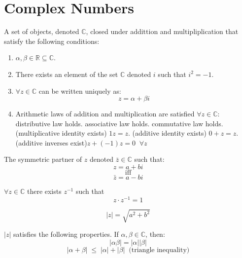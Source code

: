 \section{Complex Numbers}

\begin{defn}
	A set of objects, denoted $\mathbb{C}$, closed under addittion and multipliplication that satisfy the following conditions:
	\begin{enumerate}
		\item $\alpha, \beta \in \mathbb{R} \subseteq \mathbb{C}$.
		\item There exists an element of the set $\mathbb{C}$ denoted $i$ such that $i^2 = -1$.
		\item $\forall z \in \mathbb{C}$ can be written uniquely as: \[z = \alpha + \beta i \]
		\item Arithmetic laws of addition and multiplication are satisfied $\forall z \in \mathbb{C}$:
		\subitem distributive law holds.
		\subitem associative law holds.
		\subitem commutative law holds.
		\subitem (multiplicative identity exists) $1z = z.$
		\subitem (additive identity exists) $0 + z = z.$
		\subitem (additive inverses exist)$z + (-1)z = 0 \;\; \forall z$
	\end{enumerate}
\end{defn}
\begin{defn}
	The symmetric partner of $z$ denoted $\bar{z} \in \mathbb{C}$ such that: 
	\[ z = a + bi\] \[\text{iff}\] \[\bar{z} = a - bi \]
\end{defn}
\begin{defn}
	$\forall z \in \mathbb{C}$ there exists $z^{-1}$ such that \[z\cdot z^{-1} = 1\]
\end{defn}
\begin{defn}
	\[|z| = \sqrt{a^2 + b^2}\]
\end{defn}
\begin{thm}
	$|z|$ satisfies the following properties. If $\alpha, \beta \in \mathbb{C}$, then:
	\[|\alpha\beta| = |\alpha||\beta|\]
	\[|\alpha + \beta| \;\leq\; |\alpha| + |\beta| \;\;\text{(triangle inequality)}\]
\end{thm}
\newpage